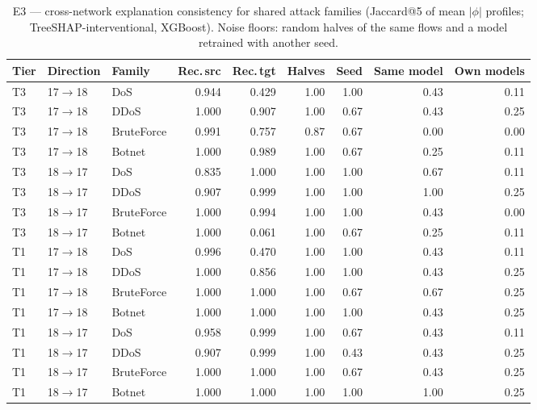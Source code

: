 \begin{table}[!htbp]
\centering
\caption{E3 --- cross-network explanation consistency for shared attack families (Jaccard@5 of mean $|\phi|$ profiles; TreeSHAP-interventional, XGBoost). Noise floors: random halves of the same flows and a model retrained with another seed.}
\label{tab:drift}
\scriptsize
\setlength{\tabcolsep}{3.5pt}
\begin{tabular}{lllrrrrrr}
\toprule
\textbf{Tier} & \textbf{Direction} & \textbf{Family} & \textbf{Rec.\,src} & \textbf{Rec.\,tgt} & \textbf{Halves} & \textbf{Seed} & \textbf{Same model} & \textbf{Own models} \\
\midrule
T3 & 17$\rightarrow$18 & DoS & 0.944 & 0.429 & 1.00 & 1.00 & 0.43 & 0.11 \\
T3 & 17$\rightarrow$18 & DDoS & 1.000 & 0.907 & 1.00 & 0.67 & 0.43 & 0.25 \\
T3 & 17$\rightarrow$18 & BruteForce & 0.991 & 0.757 & 0.87 & 0.67 & 0.00 & 0.00 \\
T3 & 17$\rightarrow$18 & Botnet & 1.000 & 0.989 & 1.00 & 0.67 & 0.25 & 0.11 \\
T3 & 18$\rightarrow$17 & DoS & 0.835 & 1.000 & 1.00 & 1.00 & 0.67 & 0.11 \\
T3 & 18$\rightarrow$17 & DDoS & 0.907 & 0.999 & 1.00 & 1.00 & 1.00 & 0.25 \\
T3 & 18$\rightarrow$17 & BruteForce & 1.000 & 0.994 & 1.00 & 1.00 & 0.43 & 0.00 \\
T3 & 18$\rightarrow$17 & Botnet & 1.000 & 0.061 & 1.00 & 0.67 & 0.25 & 0.11 \\
T1 & 17$\rightarrow$18 & DoS & 0.996 & 0.470 & 1.00 & 1.00 & 0.43 & 0.11 \\
T1 & 17$\rightarrow$18 & DDoS & 1.000 & 0.856 & 1.00 & 1.00 & 0.43 & 0.25 \\
T1 & 17$\rightarrow$18 & BruteForce & 1.000 & 1.000 & 1.00 & 0.67 & 0.67 & 0.25 \\
T1 & 17$\rightarrow$18 & Botnet & 1.000 & 1.000 & 1.00 & 1.00 & 0.43 & 0.25 \\
T1 & 18$\rightarrow$17 & DoS & 0.958 & 0.999 & 1.00 & 0.67 & 0.43 & 0.11 \\
T1 & 18$\rightarrow$17 & DDoS & 0.907 & 0.999 & 1.00 & 0.43 & 0.43 & 0.25 \\
T1 & 18$\rightarrow$17 & BruteForce & 1.000 & 1.000 & 1.00 & 0.67 & 0.43 & 0.25 \\
T1 & 18$\rightarrow$17 & Botnet & 1.000 & 1.000 & 1.00 & 1.00 & 1.00 & 0.25 \\
\bottomrule
\end{tabular}
\end{table}
